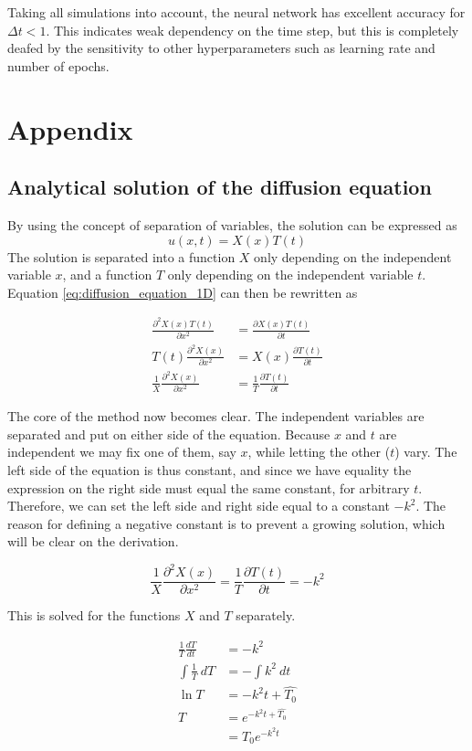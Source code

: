 \documentclass[12pt]{extarticle}
\begin{document}
Taking all simulations into account, the neural network has excellent accuracy for $\Delta t < 1$. This indicates weak dependency on the time step, but this is completely deafed by the sensitivity to other hyperparameters such as learning rate and number of epochs.

\section{Appendix}

\subsection{Analytical solution of the diffusion equation} \label{app:1D_diff_eq}
By using the concept of separation of variables, the solution can be expressed as
\[ u(x,t) = X(x)T(t) \]
The solution is separated into a function $X$ only depending on the independent variable $x$, and a function $T$ only depending on the independent variable $t$. Equation \eqref{eq:diffusion_equation_1D} can then be rewritten as

\begin{align*}
	\frac{\partial^2 X(x)T(t)}{\partial x^2} &= \frac{\partial X(x)T(t)}{\partial t} \\
	T(t)\frac{\partial^2 X(x)}{\partial x^2} &= X(x)\frac{\partial T(t)}{\partial t} \\
	\frac{1}{X}\frac{\partial^2 X(x)}{\partial x^2} &= \frac{1}{T}\frac{\partial T(t)}{\partial t}
\end{align*}

The core of the method now becomes clear. The independent variables are separated and put on either side of the equation. Because $x$ and $t$ are independent we may fix one of them, say $x$, while letting the other ($t$) vary. The left side of the equation is thus constant, and since we have equality the expression on the right side must equal the same constant, for arbitrary $t$. Therefore, we can set the left side and right side equal to a constant $-k^2$. The reason for defining a negative constant is to prevent a growing solution, which will be clear on the derivation.

\[ \frac{1}{X}\frac{\partial^2 X(x)}{\partial x^2} = \frac{1}{T}\frac{\partial T(t)}{\partial t} = -k^2\]

This is solved for the functions $X$ and $T$ separately. 

\begin{align*}
	\frac{1}{T} \frac{dT}{dt} &= -k^2 \\
	\int \frac{1}{T}\:dT &= -\int k^2\:dt \\
	\ln T &= -k^2 t + \hat{T_0} \\
	T &= e^{-k^2t + \hat{T_0}} \\
	&= T_0 e^{-k^2t}
\end{align*}
\end{document}
